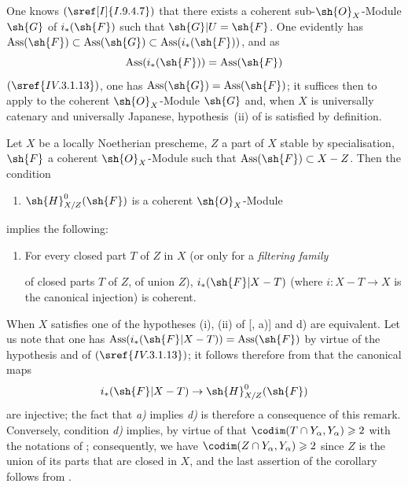 One knows $(\sref[I]{I.9.4.7})$ that there exists a coherent sub-$\sh{O}_X$-Module $\sh{G}$ of $i_*(\sh{F})$ such that $\sh{G}|U=\sh{F}$.
One evidently has $\operatorname{Ass}(\sh{F})\subset\operatorname{Ass}(\sh{G})\subset\operatorname{Ass}(i_*(\sh{F}))$, and as
\[
  \operatorname{Ass}(i_*(\sh{F}))=\operatorname{Ass}(\sh{F})
\]
$(\sref{IV.3.1.13})$, one has $\operatorname{Ass}(\sh{G})=\operatorname{Ass}(\sh{F})$; it suffices then to apply  to the coherent $\sh{O}_X$-Module $\sh{G}$ and, when $X$ is universally catenary and universally Japanese, hypothesis~(ii) of  is satisfied by definition.

\begin{corollary}[5.11.5]
\label{IV.5.11.5}
Let $X$ be a locally Noetherian prescheme, $Z$ a part of $X$ stable by specialisation, $\sh{F}$ a coherent $\sh{O}_X$-Module such that $\operatorname{Ass}(\sh{F})\subset X-Z$.
Then the condition
\begin{enumerate}
  \item[\rm a)] $\sh{H}^0_{X/Z}(\sh{F})$ is a coherent $\sh{O}_X$-Module
\end{enumerate}
implies the following:
\begin{enumerate}
  \item[\rm d)] For every closed part $T$ of $Z$ in $X$ (or only for a \emph{filtering family}


of closed parts $T$ of $Z$, of union $Z$), $i_*(\sh{F}|X-T)$ (where $i:X-T\to X$ is the canonical injection) is coherent.
\end{enumerate}
When $X$ satisfies one of the hypotheses {\rm(i), (ii)} of [, a)] and {\rm d)} are equivalent.
Let us note that one has $\operatorname{Ass}(i_*(\sh{F}|X-T))=\operatorname{Ass}(\sh{F})$ by virtue of the hypothesis and of $(\sref{IV.3.1.13})$; it follows therefore from  that the canonical maps
\[
  i_*(\sh{F}|X-T)\to\sh{H}^0_{X/Z}(\sh{F})
\]
are injective; the fact that \emph{a)} implies \emph{d)} is therefore a consequence of this remark.
Conversely, condition \emph{d)} implies, by virtue of  that $\codim(T\cap Y_\alpha,Y_\alpha)\geqslant 2$ with the notations of ; consequently, we have $\codim(Z\cap Y_\alpha,Y_\alpha)\geqslant 2$ since $Z$ is the union of its parts that are closed in $X$, and the last assertion of the corollary follows from .
\end{corollary}

